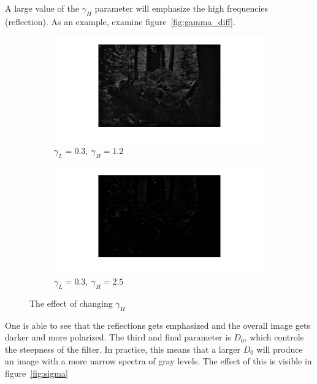 \documentclass[a4paper]{article}
\begin{document}
		A large value of the $\gamma_H$ parameter 
		will emphasize the high frequencies (reflection). As an example, 
		examine figure~\ref{fig:gamma_diff}.
		\begin{figure}[h!]
			\centering
			\begin{subfigure}[b]{0.6\textwidth}
				\includegraphics[width=\textwidth]{../pics/non_emph_high_frequnces.png}
				\caption{$\gamma_L = 0.3,~\gamma_H = 1.2$}
				\label{fig:high_freq_non_emph}
			\end{subfigure}%
			\begin{subfigure}[b]{0.6\textwidth}
				\includegraphics[width=\textwidth]{../pics/emph_high_frequnces.png}
				\caption{$\gamma_L = 0.3,~\gamma_H = 2.5$}
				\label{fig:high_freq_emph}
			\end{subfigure}
			\label{fig:high_gamma}
		\caption{The effect of changing $\gamma_H$}				
		\end{figure}		
		One is able to see that the reflections gets emphasized and the overall
		image gets darker and more polarized.
		The third and final parameter is $D_0$, which controls the steepness of the filter.
		In practice, this means that a larger $D_0$ will produce an image with a more 
		narrow spectra of gray levels. The effect of this is visible in figure~\ref{fig:sigma}
\end{document}
